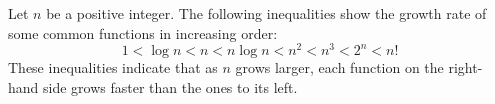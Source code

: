 \begin{theo}

    \label{thm:growth_rates}

    Let $n$ be a positive integer. The following inequalities show the growth rate of some common functions in increasing order:
    \LARGE
    \[
    1 < \log n < n < n \log n < n^2 < n^3 < 2^n < n!
    \]
    \normalsize
    These inequalities indicate that as $n$ grows larger, each function on the right-hand side grows faster than the ones to its left.
    
\end{theo}






